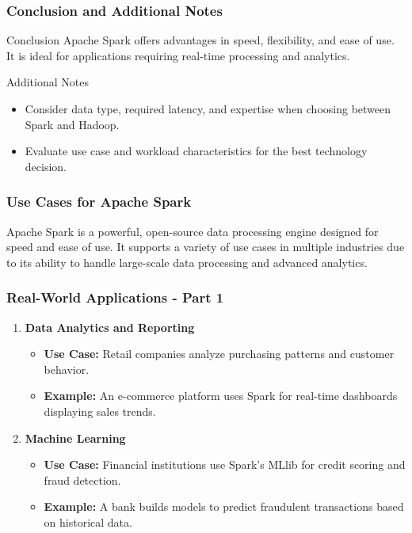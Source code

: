 \documentclass{beamer}
\begin{document}
\begin{frame}[fragile]
    \frametitle{Conclusion and Additional Notes}
    \begin{block}{Conclusion}
        Apache Spark offers advantages in speed, flexibility, and ease of use. It is ideal for applications requiring real-time processing and analytics.
    \end{block}
    \begin{block}{Additional Notes}
        \begin{itemize}
            \item Consider data type, required latency, and expertise when choosing between Spark and Hadoop.
            \item Evaluate use case and workload characteristics for the best technology decision.
        \end{itemize}
    \end{block}
\end{frame}

\begin{frame}[fragile]
    \frametitle{Use Cases for Apache Spark}
    Apache Spark is a powerful, open-source data processing engine designed for speed and ease of use. 
    It supports a variety of use cases in multiple industries due to its ability to handle large-scale data processing and advanced analytics.
\end{frame}

\begin{frame}[fragile]
    \frametitle{Real-World Applications - Part 1}
    \begin{enumerate}
        \item \textbf{Data Analytics and Reporting}
            \begin{itemize}
                \item \textbf{Use Case:} Retail companies analyze purchasing patterns and customer behavior.
                \item \textbf{Example:} An e-commerce platform uses Spark for real-time dashboards displaying sales trends.
            \end{itemize}

        \item \textbf{Machine Learning}
            \begin{itemize}
                \item \textbf{Use Case:} Financial institutions use Spark's MLlib for credit scoring and fraud detection.
                \item \textbf{Example:} A bank builds models to predict fraudulent transactions based on historical data.
            \end{itemize}
    \end{enumerate}
\end{frame}
\end{document}
